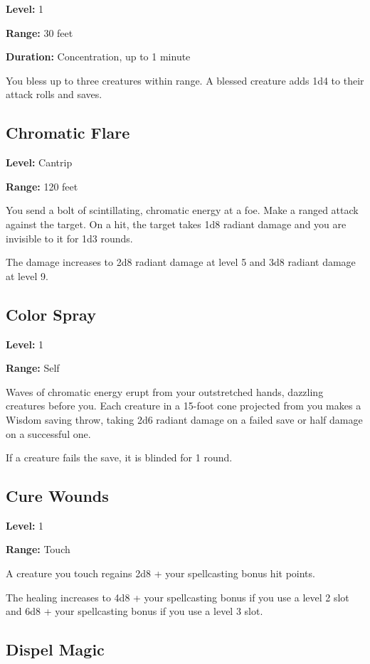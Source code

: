 \documentclass[12pt,letterpaper,twocolumn,openany,nodeprecatedcode,bg=none]{dndbook}
\let\oldsubsection\subsection
\renewcommand{\subsection}[1]{%
  \needspace{5\baselineskip}%
  \oldsubsection{#1}%
}
\begin{document}
\textbf{Level:} 1

\textbf{Range:} 30 feet

\textbf{Duration:} Concentration, up to 1 minute

You bless up to three creatures within range. A blessed creature adds
1d4 to their attack rolls and saves.

\subsection{Chromatic Flare}\label{chromatic-flare}

\textbf{Level:} Cantrip

\textbf{Range:} 120 feet

You send a bolt of scintillating, chromatic energy at a foe. Make a
ranged attack against the target. On a hit, the target takes 1d8 radiant
damage and you are invisible to it for 1d3 rounds.

The damage increases to 2d8 radiant damage at level 5 and 3d8 radiant
damage at level 9.

\subsection{Color Spray}\label{color-spray}

\textbf{Level:} 1

\textbf{Range:} Self

Waves of chromatic energy erupt from your outstretched hands, dazzling
creatures before you. Each creature in a 15-foot cone projected from you
makes a Wisdom saving throw, taking 2d6 radiant damage on a failed save
or half damage on a successful one.

If a creature fails the save, it is blinded for 1 round.

\subsection{Cure Wounds}\label{cure-wounds}

\textbf{Level:} 1

\textbf{Range:} Touch

A creature you touch regains 2d8 + your spellcasting bonus hit points.

The healing increases to 4d8 + your spellcasting bonus if you use a
level 2 slot and 6d8 + your spellcasting bonus if you use a level 3
slot.

\subsection{Dispel Magic}\label{dispel-magic}
\end{document}
